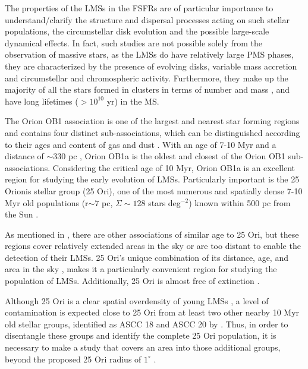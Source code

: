 \documentclass[12pt]{article}
\begin{document}
The properties of the LMSs in the FSFRs are of particular importance to understand/clarify the structure and dispersal processes acting on such stellar populations, the circumstellar disk evolution and the possible large-scale dynamical effects. In fact, such studies are not possible solely from the observation of massive stars, as the LMSs do have relatively large PMS phases, they are characterized by the presence of evolving disks, variable mass accretion and circumstellar and chromospheric activity. Furthermore, they make up the majority of all the stars formed in clusters in terms of number and mass \citep[e.g.,][]{Bastian2010}, and have long lifetimes ($>10^{10}$ yr) in the MS.

The Orion OB1 association is one of the largest and nearest star forming regions \citep[e.g. ][]{Genzel-Stutzki1989,Bally2008,Briceno2008} and contains four distinct sub-associations, which can be distinguished according to their ages and content of gas and dust \citep{Blaauw1964}. With an age of 7-10 Myr and a distance of $\sim$330 pc \citep[e.g.,][]{Briceno2005}, Orion OB1a is the oldest and closest of the Orion OB1 sub-associations. Considering the critical age of 10 Myr, Orion OB1a is an excellent region for studying the early evolution of LMSs. Particularly important is the 25 Orionis stellar group (25 Ori), one of the most numerous and spatially dense 7-10 Myr old populations (r$\sim7$ pc, $\Sigma \sim 128$ stars deg$^{-2}$) known within 500 pc from the Sun \citep{Briceno2007}. 

As mentioned in \citet{Downes2014}, there are other associations of similar age to 25 Ori, but these regions cover relatively extended areas in the sky or are too distant to enable the detection of their LMSs. 25 Ori's unique combination of its distance, age, and area in the sky \citep[360 pc, $\sim7$ Myr, and $\approx 3$ deg$^2$; ][]{Briceno2005,Briceno2007,Downes2014}, makes it a particularly convenient region for studying the population of LMSs. Additionally, 25 Ori is almost free of extinction \citep[$A_V\approx0.30$ mag.; ][]{Kharchenko2005,Briceno2005,Briceno2007,Downes2014}.

Although 25 Ori is a clear spatial overdensity of young LMSs \citep{Briceno2007,Downes2014}, a level of contamination is expected close to 25 Ori from at least two other nearby 10 Myr old stellar groups, identified as ASCC 18 and ASCC 20 by \citet{Kharchenko2005,Kharchenko2013}. Thus, in order to disentangle these groups and identify the complete 25 Ori population, it is necessary to make a study that covers an area into those additional groups, beyond the proposed 25 Ori radius of $1^\circ$ \citep{Briceno2005,Briceno2007}.
\end{document}
